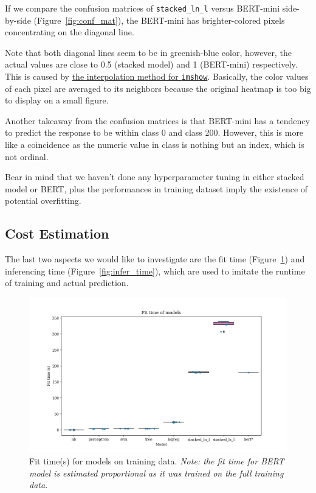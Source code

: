 \documentclass[
	a4paper,
	fontsize=10pt, %
	twoside=false, %
	secnumdepth=2, %
]{kaohandt}
\begin{document}
If we compare the confusion matrices of \texttt{stacked\_ln\_l} versus BERT-mini side-by-side (Figure~\ref{fig:conf_mat}), the BERT-mini has brighter-colored pixels concentrating on the diagonal line.

Note that both diagonal lines seem to be in greenish-blue color, however, the actual values are close to 0.5 (stacked model) and 1 (BERT-mini) respectively. This is caused by \href{https://matplotlib.org/stable/gallery/images_contours_and_fields/interpolation_methods.html}{the interpolation method for \texttt{imshow}}. Basically, the color values of each pixel are averaged to its neighbors because the original heatmap is too big to display on a small figure.

Another takeaway from the confusion matrices is that BERT-mini has a tendency to predict the response to be within class 0 and class 200. However, this is more like a coincidence as the numeric value in class is nothing but an index, which is not ordinal.


Bear in mind that we haven’t done any hyperparameter tuning in either stacked model or BERT, plus the performances in training dataset imply the existence of potential overfitting.

\subsection{Cost Estimation}

The last two aspects we would like to investigate are the fit time (Figure~\ref{fig:fit_time}) and inferencing time (Figure~\ref{fig:infer_time}), which are used to imitate the runtime of training and actual prediction.

\begin{figure}[h]
	\includegraphics[]{metric_fit_time.png}
	\caption{Fit time(s) for models on training data. \emph{Note: the fit time for BERT model is estimated proportional as it was trained on the full training data.}}
	\label{fig:fit_time}
\end{figure}
\end{document}
